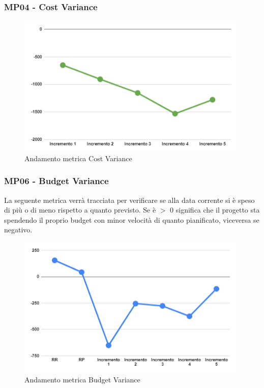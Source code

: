 \subsubsection{MP04 - Cost Variance}

\begin{figure}[H]
	\centering
	\includegraphics[width=11cm]{images/cost_variance.png}
	\caption{Andamento metrica Cost Variance}
\end{figure}

\subsubsection{MP06 - Budget Variance}
La seguente metrica verrà tracciata per verificare se alla data corrente si è speso di più o di meno rispetto a quanto previsto.
Se è $>$ 0 significa che il progetto sta spendendo il proprio budget con minor velocità di quanto pianificato, viceversa se negativo.
\begin{figure}[H]
	\centering
	\includegraphics[width=11cm]{images/budget_variance.png}
	\caption{Andamento metrica Budget Variance}
\end{figure}

